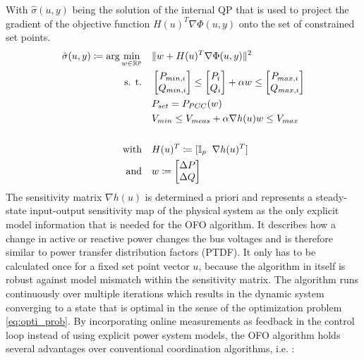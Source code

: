 \documentclass[conference,a4paper]{IEEEtran}
\begin{document}
With $\hat{\sigma}(u,y)$ being the solution of the internal QP that is used to project the gradient of the objective function  ${H}(u)^{T}\nabla \Phi(u,y)$ onto the set of constrained set points.
\begin{equation} \label{eq:ofostepcalculation}
	\begin{aligned}
		\hat{\sigma}(u,y) \coloneqq \arg \min_{w \in \mathbb{R}^{p}} \quad & \| w + H(u)^{T}\nabla \Phi(u,y)\|^{2}\\
		\textrm{s. t.} \quad & \begin{bmatrix}P_{min,i} \\Q_{min,i}\end{bmatrix}\leq \begin{bmatrix}P_i \\Q_i\end{bmatrix} + \alpha w \leq \begin{bmatrix}P_{max,i} \\Q_{max,i}\end{bmatrix}\\
		\quad & P_{set} = P_{PCC}(w)\\
		\quad & V_{min} \leq V_{meas} + \alpha \nabla h(u) w \leq V_{max} \\\\
		\textrm{with} \quad &H(u)^{T} \coloneqq [ \mathbb{I}_{p} \hspace{2mm} \nabla h(u)^{T}]\\
        \textrm{and}  \quad & w \coloneqq \begin{bmatrix}
			                 \Delta P\\ \Delta Q
		                      \end{bmatrix}
\end{aligned}
\end{equation} 
The sensitivity matrix $\nabla h(u)$ is determined a priori and represents a steady-state input-output sensitivity map of the physical system as the only explicit model information that is needed for the OFO algorithm. It describes how a change in active or reactive power changes the bus voltages and is therefore similar to power transfer distribution factors (PTDF). It only has to be calculated once for a fixed set point vector $u$, because the algorithm in itself is robust against model mismatch within the sensitivity matrix. The algorithm runs continuously over multiple iterations which results in the dynamic system converging to a state that is optimal in the sense of the optimization problem \eqref{eq:opti_prob}. By incorporating online measurements as feedback in the control loop instead of using explicit power system models, the OFO algorithm holds several advantages over conventional coordination algorithms, i.e. \cite{Hau_2021}:
\end{document}
